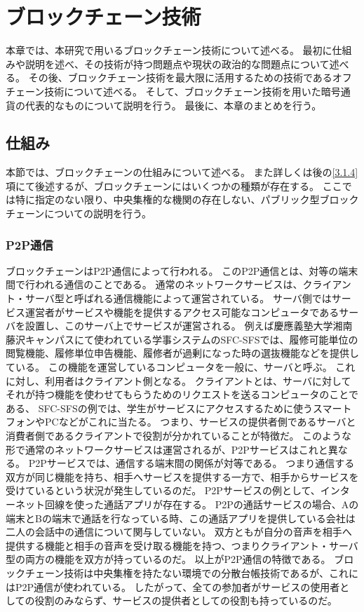 \chapter{ブロックチェーン技術}
本章では、本研究で用いるブロックチェーン技術について述べる。
最初に仕組みや説明を述べ、その技術が持つ問題点や現状の政治的な問題点について述べる。
その後、ブロックチェーン技術を最大限に活用するための技術であるオフチェーン技術について述べる。
そして、ブロックチェーン技術を用いた暗号通貨の代表的なものについて説明を行う。
最後に、本章のまとめを行う。

\section{仕組み}
本節では、ブロックチェーンの仕組みについて述べる。
また詳しくは後の\ref{3.1.4}項にて後述するが、ブロックチェーンにはいくつかの種類が存在する。
ここでは特に指定のない限り、中央集権的な機関の存在しない、パブリック型ブロックチェーンについての説明を行う。

\subsection{P2P通信}
ブロックチェーンはP2P通信によって行われる。
このP2P通信とは、対等の端末間で行われる通信のことである。
通常のネットワークサービスは、クライアント・サーバ型と呼ばれる通信機能によって運営されている。
サーバ側ではサービス運営者がサービスや機能を提供するアクセス可能なコンピュータであるサーバを設置し、このサーバ上でサービスが運営される。
例えば慶應義塾大学湘南藤沢キャンパスにて使われている学事システムのSFC-SFSでは、履修可能単位の閲覧機能、履修単位申告機能、履修者が過剰になった時の選抜機能などを提供している。
この機能を運営しているコンピュータを一般に、サーバと呼ぶ。
これに対し、利用者はクライアント側となる。
クライアントとは、サーバに対してそれが持つ機能を使わせてもらうためのリクエストを送るコンピュータのことである、
SFC-SFSの例では、学生がサービスにアクセスするために使うスマートフォンやPCなどがこれに当たる。
つまり、サービスの提供者側であるサーバと消費者側であるクライアントで役割が分かれていることが特徴だ。
このような形で通常のネットワークサービスは運営されるが、P2Pサービスはこれと異なる。
P2Pサービスでは、通信する端末間の関係が対等である。
つまり通信する双方が同じ機能を持ち、相手へサービスを提供する一方で、相手からサービスを受けているという状況が発生しているのだ。
P2Pサービスの例として、インターネット回線を使った通話アプリが存在する。
P2Pの通話サービスの場合、Aの端末とBの端末で通話を行なっている時、この通話アプリを提供している会社は二人の会話中の通信について関与していない。
双方ともが自分の音声を相手へ提供する機能と相手の音声を受け取る機能を持つ、つまりクライアント・サーバ型の両方の機能を双方が持っているのだ。
以上がP2P通信の特徴である。
ブロックチェーン技術は中央集権を持たない環境での分散台帳技術であるが、これにはP2P通信が使われている。
したがって、全ての参加者がサービスの使用者としての役割のみならず、サービスの提供者としての役割も持っているのだ。

